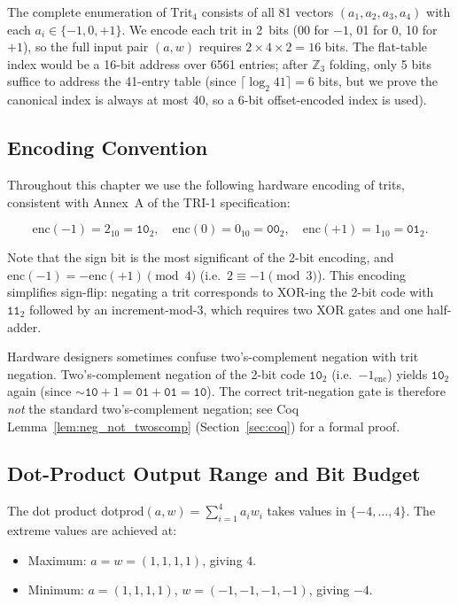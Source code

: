 The complete enumeration of \(\mathrm{Trit}_4\) consists of all 81
vectors \((a_1, a_2, a_3, a_4)\) with each \(a_i \in \{-1,0,+1\}\).
We encode each trit in 2~bits (00 for \(-1\), 01 for \(0\), 10 for
\(+1\)), so the full input pair \((a,w)\) requires \(2 \times 4 \times 2
= 16\) bits.  The flat-table index would be a 16-bit address over
6561 entries; after \(\mathbb{Z}_3\) folding, only 5 bits suffice
to address the 41-entry table (since \(\lceil \log_2 41 \rceil = 6\)
bits, but we prove the canonical index is always at most 40, so a
6-bit offset-encoded index is used).

\subsection{Encoding Convention}
\label{subsec:encoding}

Throughout this chapter we use the following hardware encoding of
trits, consistent with Annex~A of the TRI-1 specification:

\[
  \mathrm{enc}(-1) = 2_{10} = \mathtt{10}_2, \quad
  \mathrm{enc}(0)  = 0_{10} = \mathtt{00}_2, \quad
  \mathrm{enc}(+1) = 1_{10} = \mathtt{01}_2.
\]

Note that the sign bit is the most significant of the 2-bit encoding,
and \(\mathrm{enc}(-1) = -\mathrm{enc}(+1) \pmod{4}\) (i.e.\
\(2 \equiv -1 \pmod 3\)).  This encoding simplifies sign-flip: negating
a trit corresponds to XOR-ing the 2-bit code with \(\mathtt{11}_2\)
followed by an increment-mod-3, which requires two XOR gates and one
half-adder.

\begin{remark}
  Hardware designers sometimes confuse two's-complement negation with
  trit negation.  Two's-complement negation of the 2-bit code
  \(\mathtt{10}_2\) (i.e.\ \(-1_{\text{enc}}\)) yields
  \(\mathtt{10}_2\) again (since \(\sim \mathtt{10} + 1 = \mathtt{01} +
  \mathtt{01} = \mathtt{10}\)).  The correct trit-negation gate is
  therefore \emph{not} the standard two's-complement negation; see
  Coq Lemma~\ref{lem:neg_not_twoscomp} (Section~\ref{sec:coq}) for a
  formal proof.
\end{remark}

\subsection{Dot-Product Output Range and Bit Budget}
\label{subsec:bitbudget}

The dot product \(\mathrm{dotprod}(a,w) = \sum_{i=1}^4 a_i w_i\) takes
values in \(\{-4, \ldots, 4\}\).  The extreme values are achieved at:
\begin{itemize}
  \item Maximum: \(a = w = (1,1,1,1)\), giving \(4\).
  \item Minimum: \(a = (1,1,1,1)\), \(w = (-1,-1,-1,-1)\), giving \(-4\).
\end{itemize}


